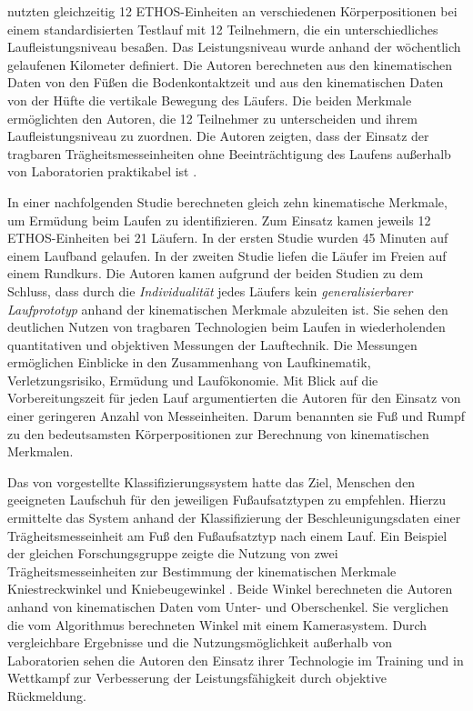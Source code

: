 \citet{Strohrmann2011} nutzten gleichzeitig 12 ETHOS-Einheiten an verschiedenen Körperpositionen bei einem standardisierten Testlauf mit 12 Teilnehmern, die ein unterschiedliches Laufleistungsniveau besaßen. Das Leistungsniveau wurde anhand der wöchentlich gelaufenen Kilometer definiert. Die Autoren berechneten aus den kinematischen Daten von den Füßen die Bodenkontaktzeit und aus den kinematischen Daten von der Hüfte die vertikale Bewegung des Läufers. Die beiden Merkmale ermöglichten den Autoren, die 12 Teilnehmer zu unterscheiden und ihrem Laufleistungsniveau zu zuordnen. Die Autoren zeigten, dass der Einsatz der tragbaren Trägheitsmesseinheiten ohne Beeinträchtigung des Laufens außerhalb von Laboratorien praktikabel ist \citep{Strohrmann2011a}.

In einer nachfolgenden Studie berechneten \citet{Strohrmann2012} gleich zehn kinematische Merkmale, um Ermüdung beim Laufen zu identifizieren. Zum Einsatz kamen jeweils 12 ETHOS-Einheiten bei 21 Läufern. In der ersten Studie wurden 45 Minuten auf einem Laufband gelaufen. In der zweiten Studie liefen die Läufer im Freien auf einem Rundkurs. Die Autoren kamen aufgrund der beiden Studien zu dem Schluss, dass durch die \emph{Individualität} jedes Läufers kein \emph{generalisierbarer Laufprototyp} anhand der kinematischen Merkmale abzuleiten ist. Sie sehen den deutlichen Nutzen von tragbaren Technologien beim Laufen in wiederholenden quantitativen und objektiven Messungen der Lauftechnik. Die Messungen ermöglichen Einblicke in den Zusammenhang von Laufkinematik, Verletzungsrisiko, Ermüdung und Laufökonomie. Mit Blick auf die Vorbereitungszeit für jeden Lauf argumentierten die Autoren für den Einsatz von einer geringeren Anzahl von Messeinheiten. Darum benannten sie Fuß und Rumpf zu den bedeutsamsten Körperpositionen zur Berechnung von kinematischen Merkmalen.

Das von \citet{Eskofier2013} vorgestellte Klassifizierungssystem hatte das Ziel, Menschen den geeigneten Laufschuh für den jeweiligen Fußaufsatztypen zu empfehlen. Hierzu ermittelte das System anhand der Klassifizierung der Beschleunigungsdaten einer Trägheitsmesseinheit am Fuß den Fußaufsatztyp nach einem Lauf. Ein Beispiel der gleichen Forschungsgruppe zeigte die Nutzung von zwei Trägheitsmesseinheiten zur Bestimmung der kinematischen Merkmale Kniestreckwinkel und Kniebeugewinkel \citep{Jakob2013}. Beide Winkel berechneten die Autoren anhand von kinematischen Daten vom Unter- und Oberschenkel. Sie verglichen die vom Algorithmus berechneten Winkel mit einem Kamerasystem. Durch vergleichbare Ergebnisse und die Nutzungsmöglichkeit außerhalb von Laboratorien sehen die Autoren den Einsatz ihrer Technologie im Training und in Wettkampf zur Verbesserung der Leistungsfähigkeit durch objektive Rückmeldung.


